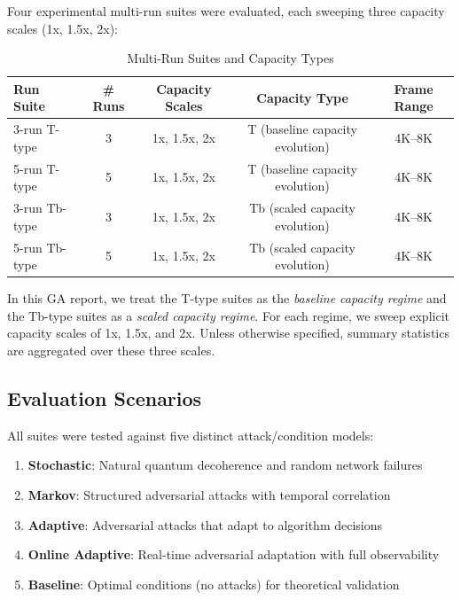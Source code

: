 \documentclass[11pt,a4paper]{article}
\begin{document}
Four experimental multi-run suites were evaluated, each sweeping three capacity scales (1x, 1.5x, 2x):

\begin{table}[H]
\centering
\caption{Multi-Run Suites and Capacity Types}
\begin{tabular}{|l|c|c|c|c|}
\hline
\textbf{Run Suite} & \textbf{\# Runs} & \textbf{Capacity Scales} & \textbf{Capacity Type} & \textbf{Frame Range} \\
\hline
\hline
3-run T-type   & 3 & 1x, 1.5x, 2x & T  (baseline capacity evolution) & 4K--8K \\
5-run T-type   & 5 & 1x, 1.5x, 2x & T  (baseline capacity evolution) & 4K--8K \\
3-run Tb-type  & 3 & 1x, 1.5x, 2x & Tb (scaled capacity evolution)    & 4K--8K \\
5-run Tb-type  & 5 & 1x, 1.5x, 2x & Tb (scaled capacity evolution)    & 4K--8K \\
\hline
\end{tabular}
\end{table}

\noindent
In this GA report, we treat the T-type suites as the \emph{baseline capacity regime} and the Tb-type suites as a \emph{scaled capacity regime}. For each regime, we sweep explicit capacity scales of 1x, 1.5x, and 2x. Unless otherwise specified, summary statistics are aggregated over these three scales.

\subsection{Evaluation Scenarios}

All suites were tested against five distinct attack/condition models:

\begin{enumerate}
\item \textbf{Stochastic}: Natural quantum decoherence and random network failures
\item \textbf{Markov}: Structured adversarial attacks with temporal correlation
\item \textbf{Adaptive}: Adversarial attacks that adapt to algorithm decisions
\item \textbf{Online Adaptive}: Real-time adversarial adaptation with full observability
\item \textbf{Baseline}: Optimal conditions (no attacks) for theoretical validation
\end{enumerate}
\end{document}
